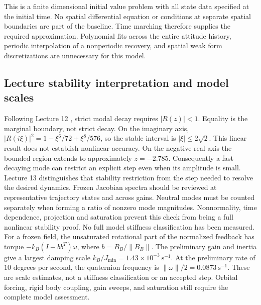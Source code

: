 This is a finite dimensional initial value problem with all state data specified at the initial time. No spatial differential equation or conditions at separate spatial boundaries are part of the baseline. Time marching therefore supplies the required approximation. Polynomial fits across the entire attitude history, periodic interpolation of a nonperiodic recovery, and spatial weak form discretizations are unnecessary for this model.

\subsection{Lecture stability interpretation and model scales}
Following Lecture 12 \cite{goza12}, strict modal decay requires $|R(z)|<1$.
Equality is the marginal boundary, not strict decay. On the imaginary axis,
$|R(i\xi)|^2=1-\xi^6/72+\xi^8/576$, so the stable interval is
$|\xi|\leq2\sqrt2$. This linear result does not establish nonlinear accuracy.
On the negative real axis the bounded region extends to approximately
$z=-2.785$. Consequently a fast decaying mode can restrict an explicit step
even when its amplitude is small. Lecture 13 \cite{goza13} distinguishes that stability
restriction from the step needed to resolve the desired dynamics.
Frozen Jacobian spectra should be reviewed at representative trajectory
states and across gains. Neutral modes must be counted separately when
forming a ratio of nonzero mode magnitudes. Nonnormality, time dependence,
projection and saturation prevent this check from being a full nonlinear
stability proof. No full model stiffness classification has been measured.
For a frozen field, the unsaturated rotational part of the normalized feedback
has torque $-k_B(I-bb^T)\omega$, where $b=B_B/\|B_B\|$.
The preliminary gain and inertia give a largest damping scale
$k_B/J_{\min}=1.43\times10^{-3}\ \mathrm{s}^{-1}$.
At the preliminary rate of $10$ degrees per second, the quaternion frequency
is $\|\omega\|/2=0.0873\ \mathrm{s}^{-1}$.
These are scale estimates, not a stiffness classification or an accepted step.
Orbital forcing, rigid body coupling, gain sweeps, and saturation still require
the complete model assessment.

